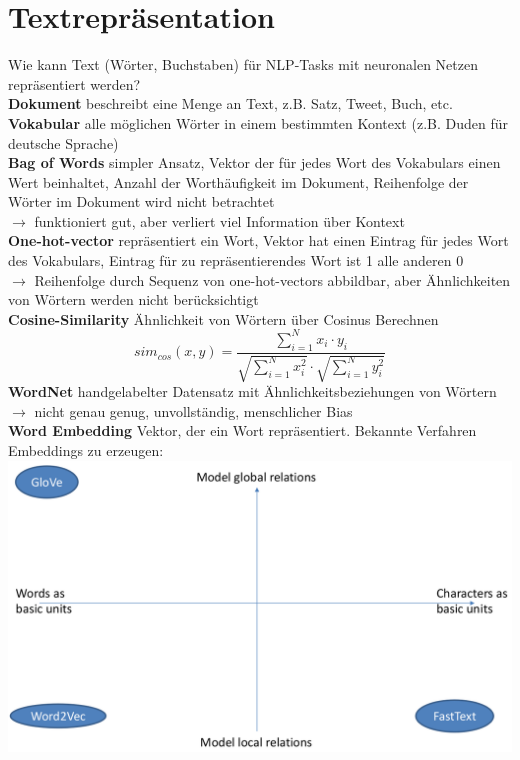 \documentclass[12pt]{article}
\begin{document}
	\section{Textrepräsentation}
	Wie kann Text (Wörter, Buchstaben) für NLP-Tasks mit neuronalen Netzen repräsentiert werden?\\
	\textbf{Dokument} beschreibt eine Menge an Text, z.B. Satz, Tweet, Buch, etc.\\
	\textbf{Vokabular} alle möglichen Wörter in einem bestimmten Kontext (z.B. Duden für deutsche Sprache)\\
	\textbf{Bag of Words} simpler Ansatz, Vektor der für jedes Wort des Vokabulars einen Wert beinhaltet, Anzahl der Worthäufigkeit im Dokument, Reihenfolge der Wörter im Dokument wird nicht betrachtet\\
	$\rightarrow$ funktioniert gut, aber verliert viel Information über Kontext\\
	\textbf{One-hot-vector} repräsentiert ein Wort, Vektor hat einen Eintrag für jedes Wort des Vokabulars, Eintrag für zu repräsentierendes Wort ist 1 alle anderen 0\\
	$\rightarrow$ Reihenfolge durch Sequenz von one-hot-vectors abbildbar, aber Ähnlichkeiten von Wörtern werden nicht berücksichtigt\\
	\textbf{Cosine-Similarity} Ähnlichkeit von Wörtern über Cosinus Berechnen
	$$sim_{cos}(x,y) = \frac{\sum_{i=1}^N x_i \cdot y_i}{\sqrt{\sum_{i=1}^N x_i^2} \cdot \sqrt{\sum_{i=1}^N y_i^2}}$$
	\textbf{WordNet} handgelabelter Datensatz mit Ähnlichkeitsbeziehungen von Wörtern $\rightarrow$ nicht genau genug, unvollständig, menschlicher Bias\\
	\textbf{Word Embedding} Vektor, der ein Wort repräsentiert. Bekannte Verfahren Embeddings zu erzeugen:\\
	\includegraphics[width=\linewidth]{figures/word-embeddings.png}\\
\end{document}

